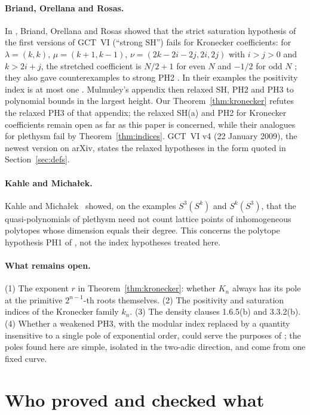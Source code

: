 \documentclass[11pt,a4paper]{article}
\theoremstyle{definition}
\begin{document}
\paragraph{Briand, Orellana and Rosas.}
In \cite{BOR}, Briand, Orellana and Rosas showed that the strict saturation
hypothesis of the first versions of GCT~VI (``strong SH'') fails for Kronecker
coefficients: for $\lambda=(k,k)$, $\mu=(k+1,k-1)$, $\nu=(2k-2i-2j,2i,2j)$
with $i>j>0$ and $k>2i+j$, the stretched coefficient is $N/2+1$ for even $N$
and $-1/2$ for odd $N$ \cite[Theorem 2.4, p.~7]{BOR}; they also gave
counterexamples to strong PH2 \cite[Section 2.4, p.~8]{BOR}. In their examples
the positivity index is at most one \cite[Section 2.5, p.~8]{BOR}. Mulmuley's
appendix \cite[pp.~18--20]{BOR} then relaxed SH, PH2 and PH3 to polynomial
bounds in the largest height. Our Theorem~\ref{thm:kronecker} refutes the
relaxed PH3 of that appendix; the relaxed SH(a) and PH2 for Kronecker
coefficients remain open as far as this paper is concerned, while their
analogues for plethysm fail by Theorem~\ref{thm:indices}. GCT~VI v4 (22 January
2009), the newest version on arXiv, states the relaxed hypotheses in the form
quoted in Section~\ref{sec:defs}.

\paragraph{Kahle and Micha\l{}ek.}
Kahle and Micha\l{}ek~\cite{KM} showed, on the examples $S^3(S^k)$ and
$S^k(S^3)$, that the quasi-polynomials of plethysm need not count lattice points
of inhomogeneous polytopes whose dimension equals their degree. This concerns
the polytope hypothesis PH1 of \cite{GCT6}, not the index hypotheses treated
here.

\paragraph{What remains open.}
(1) The exponent $r$ in Theorem~\ref{thm:kronecker}: whether $K_n$ always has
its pole at the primitive $2^{n-1}$-th roots themselves. (2) The positivity and
saturation indices of the Kronecker family $k_n$. (3) The density clauses
1.6.5(b) and 3.3.2(b). (4) Whether a weakened PH3, with the modular index
replaced by a quantity insensitive to a single pole of exponential order, could
serve the purposes of \cite{GCT6}; the poles found here are simple, isolated in
the two-adic direction, and come from one fixed curve.

\section{Who proved and checked what}\label{sec:provenance}
\end{document}

